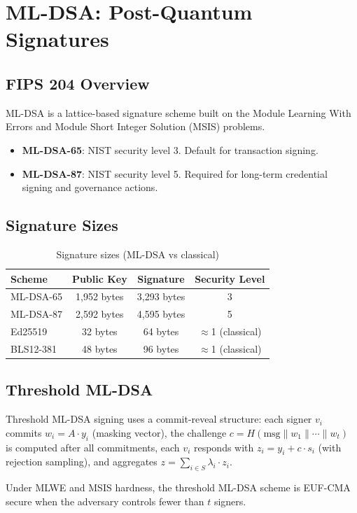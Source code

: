 \section{ML-DSA: Post-Quantum Signatures}


\subsection{FIPS 204 Overview}

ML-DSA is a lattice-based signature scheme built on the Module Learning With Errors and Module Short Integer Solution (MSIS) problems.

\begin{definition}
\begin{itemize}
\item \textbf{ML-DSA-65}: NIST security level 3. Default for transaction signing.
\item \textbf{ML-DSA-87}: NIST security level 5. Required for long-term credential signing and governance actions.
\end{itemize}
\end{definition}

\subsection{Signature Sizes}

\begin{table}[h]
\centering
\begin{tabular}{lccc}
\toprule
\textbf{Scheme} & \textbf{Public Key} & \textbf{Signature} & \textbf{Security Level} \\
\midrule
ML-DSA-65 & 1,952 bytes & 3,293 bytes & 3 \\
ML-DSA-87 & 2,592 bytes & 4,595 bytes & 5 \\
Ed25519 & 32 bytes & 64 bytes & $\approx$1 (classical) \\
BLS12-381 & 48 bytes & 96 bytes & $\approx$1 (classical) \\
\bottomrule
\end{tabular}
\caption{Signature sizes (ML-DSA vs classical)}
\label{tab:dsa-sizes}
\end{table}

\subsection{Threshold ML-DSA}

Threshold ML-DSA signing uses a commit-reveal structure: each signer $v_i$ commits $w_i = A \cdot y_i$ (masking vector), the challenge $c = H(\text{msg} \| w_1 \| \cdots \| w_t)$ is computed after all commitments, each $v_i$ responds with $z_i = y_i + c \cdot s_i$ (with rejection sampling), and \KeyVM{} aggregates $z = \sum_{i \in S} \lambda_i \cdot z_i$.

\begin{theorem}
Under MLWE and MSIS hardness, the threshold ML-DSA scheme is EUF-CMA secure when the adversary controls fewer than $t$ signers.
\end{theorem}

